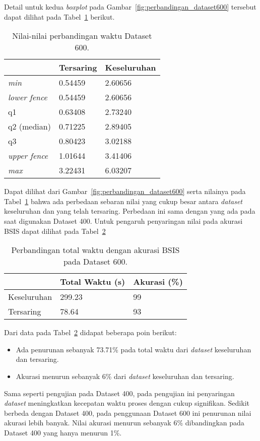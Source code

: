 Detail untuk kedua \textit{boxplot} pada Gambar~\ref{fig:perbandingan_dataset600} tersebut dapat dilihat pada Tabel~\ref{tab:perbandingan_dataset600} berikut.
\begin{table}[H]
	\centering
	\begin{tabular}{|l|l|l|}
		\hline
		& \textbf{Tersaring} & \textbf{Keseluruhan} \\ \hline
		\textit{min}         & 0.54459            & 2.60656              \\ \hline
		\textit{lower fence} & 0.54459            & 2.60656              \\ \hline
		q1                   & 0.63408            & 2.73240              \\ \hline
		q2 (median)          & 0.71225            & 2.89405              \\ \hline
		q3                   & 0.80423            & 3.02188              \\ \hline
		\textit{upper fence} & 1.01644            & 3.41406              \\ \hline
		\textit{max}         & 3.22431            & 6.03207              \\ \hline
	\end{tabular}
	\caption{Nilai-nilai perbandingan waktu Dataset 600.}
	\label{tab:perbandingan_dataset600}
\end{table}
Dapat dilihat dari Gambar~\ref{fig:perbandingan_dataset600} serta nilainya pada Tabel~\ref{tab:perbandingan_dataset600} bahwa ada perbedaan sebaran nilai yang cukup besar antara \textit{dataset} keseluruhan dan yang telah tersaring. Perbedaan ini sama dengan yang ada pada saat digunakan Dataset 400. Untuk pengaruh penyaringan nilai pada akurasi BSIS dapat dilihat pada Tabel~\ref{tab:waktu_akurasi_dataset600}
\begin{table}[H]
	\centering
	\begin{tabular}{|l|l|l|}
		\hline
		& \textbf{Total Waktu (s)} & \textbf{Akurasi (\%)} \\ \hline
		Keseluruhan & 299.23                   & 99                    \\ \hline
		Tersaring   & 78.64                    & 93                    \\ \hline
	\end{tabular}
	\caption{Perbandingan total waktu dengan akurasi BSIS pada Dataset 600.}
	\label{tab:waktu_akurasi_dataset600}
\end{table}
Dari data pada Tabel~\ref{tab:waktu_akurasi_dataset600} didapat beberapa poin berikut:
\begin{itemize}
	\item Ada penurunan sebanyak 73.71\% pada total waktu dari \textit{dataset} keseluruhan dan tersaring.
	\item Akurasi menurun sebanyak 6\% dari \textit{dataset} keseluruhan dan tersaring.
\end{itemize}
Sama seperti pengujian pada Dataset 400, pada pengujian ini penyaringan \textit{dataset} meningkatkan kecepatan waktu proses dengan cukup signifikan. Sedikit berbeda dengan Dataset 400, pada penggunaan Dataset 600 ini penurunan nilai akurasi lebih banyak. Nilai akurasi menurun sebanyak 6\% dibandingkan pada Dataset 400 yang hanya menurun 1\%. 

